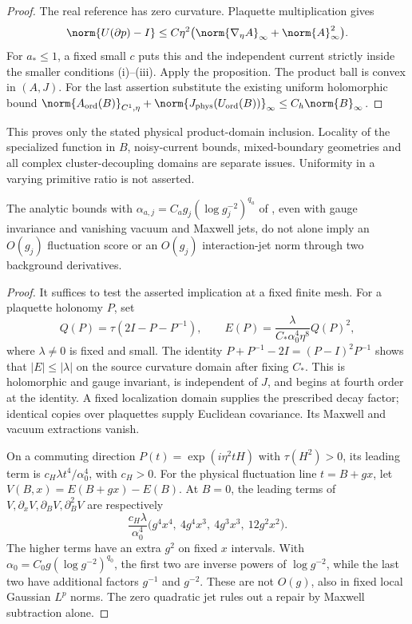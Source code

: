 \begin{proof}
The real reference has zero curvature. Plaquette multiplication gives
\[
 \norm{U(\partial p)-I}
 \leq C\eta^2
 \bigl(\norm{\nabla_\eta A}_\infty+\norm{A}_\infty^2\bigr).
\]
For $a_*\leq1$, a fixed small $c$ puts this and the independent current
strictly inside the smaller conditions (i)--(iii). Apply the proposition.
The product ball is convex in $(A,J)$. For the last assertion substitute
the existing uniform holomorphic bound
$\norm{A_{\rm ord}(B)}_{C^1,\eta}
+\norm{J_{\rm phys}(U_{\rm ord}(B))}_\infty\leq C_h\norm{B}_\infty$.
\end{proof}

This proves only the stated physical product-domain inclusion.
Locality of the specialized function in $B$, noisy-current bounds,
mixed-boundary geometries and all complex cluster-decoupling domains
are separate issues. Uniformity in a varying primitive ratio is not
asserted.

\begin{proposition}
The analytic bounds with
$\alpha_{a,j}=C_a g_j(\log g_j^{-2})^{q_a}$ of
\cite[(2.27)--(2.31)]{B119}, even with gauge invariance and vanishing
vacuum and Maxwell jets, do not alone imply an $O(g_j)$ fluctuation
score or an $O(g_j)$ interaction-jet norm through two background
derivatives.
\end{proposition}

\begin{proof}
It suffices to test the asserted implication at a fixed finite mesh.
For a plaquette holonomy $P$, set
\[
 Q(P)=\tau(2I-P-P^{-1}),\qquad
 E(P)=\frac{\lambda}{C_*\alpha_0^4\eta^8}Q(P)^2,
\]
where $\lambda\ne0$ is fixed and small. The identity
$P+P^{-1}-2I=(P-I)^2P^{-1}$ shows that $|E|\leq|\lambda|$ on the
source curvature domain after fixing $C_*$. This is holomorphic and
gauge invariant, is independent of $J$, and begins at fourth order
at the identity. A fixed localization domain supplies the prescribed
decay factor; identical copies over plaquettes supply Euclidean
covariance. Its Maxwell and vacuum extractions vanish.

On a commuting direction $P(t)=\exp(i\eta^2tH)$ with
$\tau(H^2)>0$, its leading term is
$c_H\lambda t^4/\alpha_0^4$, with $c_H>0$. For the physical
fluctuation line $t=B+gx$, let $V(B,x)=E(B+gx)-E(B)$. At $B=0$,
the leading terms of $V,\partial_xV,\partial_BV,\partial_B^2V$ are
respectively
\[
 \frac{c_H\lambda}{\alpha_0^4}
 \bigl(g^4x^4,\ 4g^4x^3,\ 4g^3x^3,\ 12g^2x^2\bigr).
\]
The higher terms have an extra $g^2$ on fixed $x$ intervals. With
$\alpha_0=C_0g(\log g^{-2})^{q_0}$, the first two are inverse powers
of $\log g^{-2}$, while the last two have additional factors $g^{-1}$
and $g^{-2}$. These are not $O(g)$, also in fixed local Gaussian
$L^p$ norms. The zero quadratic jet rules out a repair by Maxwell
subtraction alone.
\end{proof}

